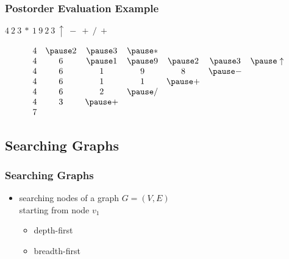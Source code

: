 \documentclass[dvipsnames]{beamer}
\begin{document}
\begin{frame}
  \frametitle{Postorder Evaluation Example}

  \begin{example}[$t ~ u ~ v ~ * ~ w ~ x ~ y ~ z ~ \uparrow ~ - ~ + ~ / ~ +$]
    $4 ~ 2 ~ 3 ~ * ~ 1 ~ 9 ~ 2 ~ 3 ~ \uparrow ~ - ~ + ~ / ~ +$

    \pause
    \medskip
    \[
      \begin{array}{ccccccc}
  4 & \pause 2 & \pause 3 & \pause * &          &          &                \\
  4 &        6 & \pause 1 & \pause 9 & \pause 2 & \pause 3 & \pause \uparrow\\
  4 &        6 &        1 &        9 &        8 & \pause - &                \\
  4 &        6 &        1 &        1 & \pause + &          &                \\
  4 &        6 &        2 & \pause / &          &          &                \\
  4 &        3 & \pause + &          &          &          &                \\
  7 &          &          &          &          &          &                \\
      \end{array}
    \]
  \end{example}
\end{frame}

\subsection{Searching Graphs}

\begin{frame}
  \frametitle{Searching Graphs}

  \begin{itemize}
    \item searching nodes of a graph $G=(V,E)$\\
     starting from node $v_1$
    \begin{itemize}
      \item depth-first
      \item breadth-first
    \end{itemize}
  \end{itemize}
\end{frame}
\end{document}
